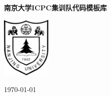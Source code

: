 \documentclass[9pt,landscape]{article}
\begin{document}
\vspace{3cm}
\thispagestyle{empty}
\null\vfill
\begin{center}
  \Huge \textbf{南京大学ICPC集训队代码模板库} \\
\vspace{1.5cm}

\includegraphics[height=3cm]{njulogo.pdf}
\end{center}

\vspace{2cm}

\begin{minipage}{0.9\linewidth}
\begin{flushright}
\today
\end{flushright}
\end{minipage}
\vfill
\clearpage

\begin{multicols}{2}
\tableofcontents
\end{multicols}

\newpage


\begin{multicols}{2}

\end{multicols}
\end{document}
